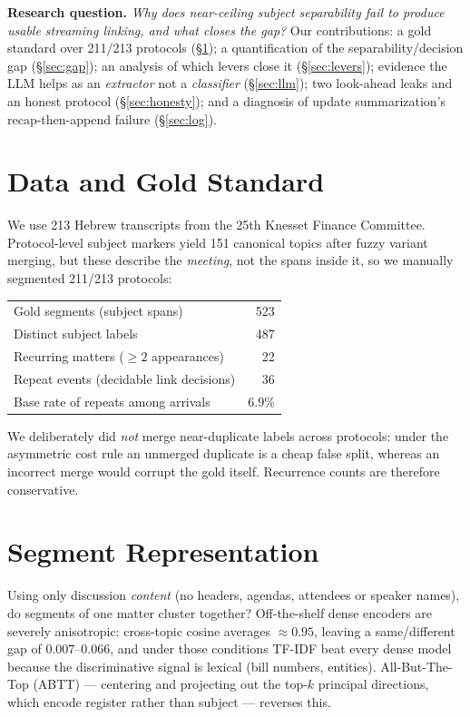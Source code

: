 \documentclass[10pt,a4paper,twocolumn]{article}
\begin{document}
\textbf{Research question.} \emph{Why does near-ceiling subject separability fail to produce
usable streaming linking, and what closes the gap?} Our contributions: a gold standard over
211/213 protocols (\S\ref{sec:data}); a quantification of the separability/decision gap
(\S\ref{sec:gap}); an analysis of which levers close it (\S\ref{sec:levers}); evidence the LLM
helps as an \emph{extractor} not a \emph{classifier} (\S\ref{sec:llm}); two look-ahead leaks
and an honest protocol (\S\ref{sec:honesty}); and a diagnosis of update summarization's
recap-then-append failure (\S\ref{sec:log}).

\section{Data and Gold Standard}
\label{sec:data}

We use 213 Hebrew transcripts from the 25th Knesset Finance Committee. Protocol-level subject
markers yield 151 canonical topics after fuzzy variant merging, but these describe the
\emph{meeting}, not the spans inside it, so we manually segmented 211/213 protocols:

\begin{center}\small
\begin{tabular}{lr}
\toprule
Gold segments (subject spans) & 523 \\
Distinct subject labels & 487 \\
Recurring matters ($\ge 2$ appearances) & 22 \\
Repeat events (decidable link decisions) & 36 \\
Base rate of repeats among arrivals & $6.9\%$ \\
\bottomrule
\end{tabular}
\end{center}

We deliberately did \emph{not} merge near-duplicate labels across protocols: under the
asymmetric cost rule an unmerged duplicate is a cheap false split, whereas an incorrect merge
would corrupt the gold itself. Recurrence counts are therefore conservative.

\section{Segment Representation}

Using only discussion \emph{content} (no headers, agendas, attendees or speaker names), do
segments of one matter cluster together? Off-the-shelf dense encoders are severely
anisotropic: cross-topic cosine averages $\approx0.95$, leaving a same/different gap of
$0.007$--$0.066$, and under those conditions TF-IDF beat every dense model because the
discriminative signal is lexical (bill numbers, entities). All-But-The-Top (ABTT) --- centering
and projecting out the top-$k$ principal directions, which encode register rather than
subject --- reverses this.
\end{document}
